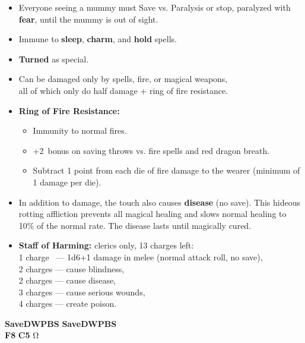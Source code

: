 \documentclass[english,11pt,openany,letterpaper,twocolumn]{book}
\begin{document}
\begin{itemize}[leftmargin=*,label=\itshape\textbullet]
	\item
	Everyone seeing a mummy must Save vs. Paralysis or stop, paralyzed with \textbf{fear}, until the mummy is out of sight.
	\item
	Immune to \textbf{sleep}, \textbf{charm}, and \textbf{hold} spells.
	\item
	\textbf{Turned} as special.
	\item
	Can be damaged only by spells, fire, or magical weapons,\\all of which only do half damage + ring of fire resistance.
	\item
	\textbf{Ring of Fire Resistance:}
	\begin{itemize}[leftmargin=*,label=\bfseries\textbullet]
		\item Immunity to normal fires.
		\item +2~bonus on saving throws vs. fire spells and red dragon breath.
		\item Subtract 1 point from each die of fire damage to the wearer (minimum of 1 damage per die).
	\end{itemize}
	\item
	In addition to damage, the touch also causes \textbf{disease} (no save). This hideous rotting affliction prevents all magical healing and slows normal healing to 10\% of the normal rate. The disease lasts until magically cured.
	\item
	\textbf{Staff of Harming:} clerics only, 13 charges left:\\
		1 charge ~--- 1d6+1 damage in melee (normal attack roll, no save),\\
		2 charges --- cause blindness,\\
		2 charges --- cause disease,\\
		3 charges --- cause serious wounds,\\
		4 charges --- create poison.\\
\end{itemize}

\vfill


\tab
\overprintw[24\charwidth]{\_}%
\textbf{Save\tab D\tab W\tab P\tab B\tab S}\tab
\overprintw[24\charwidth]{\_}%
\textbf{Save\tab D\tab W\tab P\tab B\tab S}\\

\tab\textbf{F8}
\tab\textbf{C5}
\hfill Ω

\end{document}
